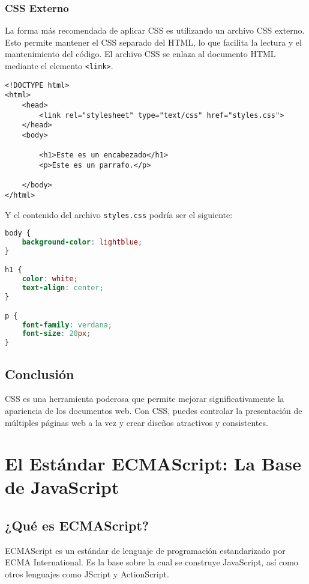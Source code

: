 \documentclass{book}
\begin{document}
\subsection{CSS Externo}

La forma más recomendada de aplicar CSS es utilizando un archivo CSS externo. Esto permite mantener el CSS separado del HTML, lo que facilita la lectura y el mantenimiento del código. El archivo CSS se enlaza al documento HTML mediante el elemento \texttt{<link>}.

\begin{lstlisting}[language=HTML5]
<!DOCTYPE html>
<html>
    <head>
        <link rel="stylesheet" type="text/css" href="styles.css">
    </head>
    <body>
    
        <h1>Este es un encabezado</h1>
        <p>Este es un parrafo.</p>
    
    </body>
</html>
\end{lstlisting}

Y el contenido del archivo \texttt{styles.css} podría ser el siguiente:

\begin{lstlisting}[language=CSS]
body {
    background-color: lightblue;
}

h1 {
    color: white;
    text-align: center;
}

p {
    font-family: verdana;
    font-size: 20px;
}
\end{lstlisting}

\section{Conclusión}

CSS es una herramienta poderosa que permite mejorar significativamente la apariencia de los documentos web. Con CSS, puedes controlar la presentación de múltiples páginas web a la vez y crear diseños atractivos y consistentes.


\chapter{El Estándar ECMAScript: La Base de JavaScript}

\section{¿Qué es ECMAScript?}

ECMAScript es un estándar de lenguaje de programación estandarizado por ECMA International. Es la base sobre la cual se construye JavaScript, así como otros lenguajes como JScript y ActionScript.
\end{document}
